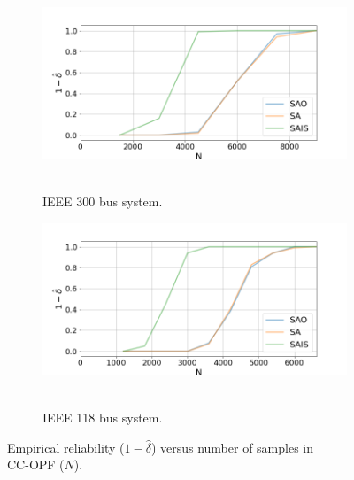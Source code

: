 \begin{figure}[hbt]
\centering
\begin{subfigure}{.8\textwidth}
  \centering
  \includegraphics[width=0.99\linewidth]{Dissertation/images/dc_stochastic_approx/case300/1_beta_N_12000_eta_001.png}~~~~~~\hfill
  \caption{IEEE 300 bus system.}
  \label{fig:ieee300reliability}
\end{subfigure}

\begin{subfigure}{.8\textwidth}
  \centering
  \includegraphics[width=0.99\linewidth]{Dissertation/images/dc_stochastic_approx/ieee118/1_beta_N_7800_eta_001.png}~~~~~~\hfill
  \caption{IEEE 118 bus system.}
  \label{fig:ieee118reliability}
\end{subfigure}
\caption{Empirical reliability ($1-\hat{\delta}$) versus number of samples in \\CC-OPF ($N$).}
\label{fig:empiricals}
\end{figure}

